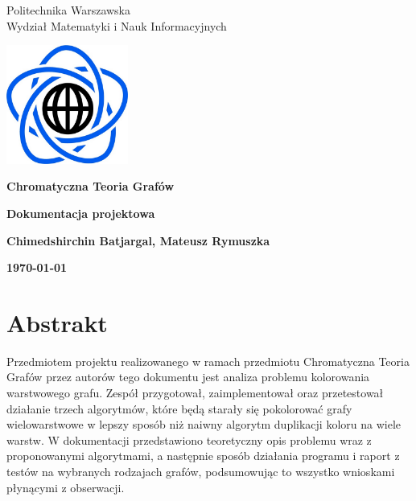 \documentclass[10pt,a4paper]{article}
\begin{document}
	\begin{titlepage}
		\begin{center}
			{\fontsize{14}{12}\selectfont Politechnika Warszawska \\ Wydział Matematyki i Nauk Informacyjnych}
			
		\end{center}
		
		\vspace{1cm}
		\begin{center}
			\includegraphics[width=0.3\textwidth]{images/logo.png}
		\end{center}
		\vspace{3cm}
		
		\begin{center}
			\textbf{{\fontsize{26}{12}\selectfont Chromatyczna Teoria Grafów}}
			
			\vspace{2cm}
			\textbf{{\fontsize{22}{12}\selectfont Dokumentacja projektowa}}
			\vspace{1cm}
			
			\textbf{{\fontsize{13.5}{12}\selectfont Chimedshirchin Batjargal, Mateusz Rymuszka}}
			
			\vspace{6cm}
			\textbf{{\fontsize{13.5}{12}\selectfont \today}}
		\end{center}  
	\end{titlepage}
	
	{\fontsize{13.5}{12}\selectfont
		\tableofcontents
		\vspace{1cm}
		{\renewcommand{\arraystretch}{2.0}
		\newpage
	}}
	
	\section{Abstrakt}
	
	Przedmiotem projektu realizowanego w ramach przedmiotu Chromatyczna Teoria Grafów przez autorów tego dokumentu jest analiza problemu kolorowania warstwowego grafu. Zespół przygotował, zaimplementował oraz przetestował działanie trzech algorytmów, które będą starały się pokolorować grafy wielowarstwowe w lepszy sposób niż naiwny algorytm duplikacji koloru na wiele warstw. W dokumentacji przedstawiono teoretyczny opis problemu wraz z proponowanymi algorytmami, a następnie sposób działania programu i raport z testów na wybranych rodzajach grafów, podsumowując to wszystko wnioskami płynącymi z obserwacji.
	
\end{document}
